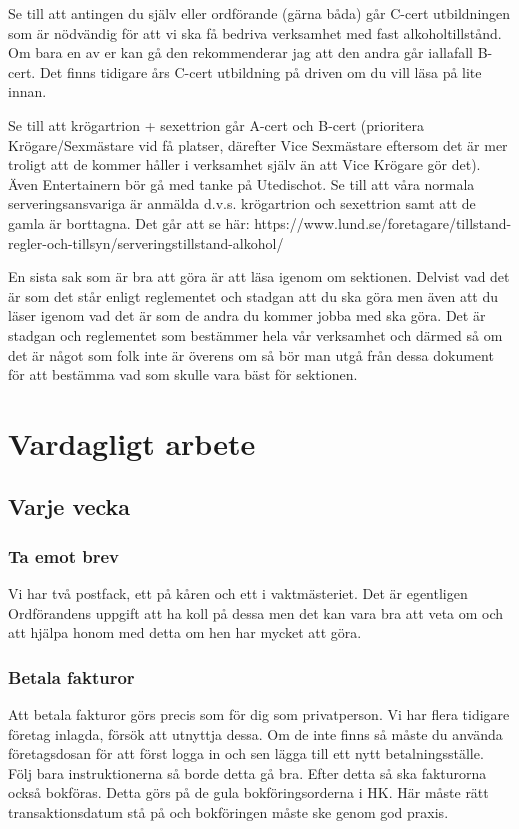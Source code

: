 \documentclass[10pt]{article}
\begin{document}
Se till att antingen du själv eller ordförande (gärna båda) går C-cert utbildningen som är nödvändig för att vi ska få bedriva verksamhet med fast alkoholtillstånd. Om bara en av er kan gå den rekommenderar jag att den andra går iallafall B-cert. Det finns tidigare års C-cert utbildning på driven om du vill läsa på lite innan.

Se till att krögartrion + sexettrion går A-cert och B-cert (prioritera Krögare/Sexmästare vid få platser, därefter Vice Sexmästare eftersom det är mer troligt att de kommer håller i verksamhet själv än att Vice Krögare gör det). Även Entertainern bör gå med tanke på Utedischot.
Se till att våra normala serveringsansvariga är anmälda d.v.s. krögartrion och sexettrion samt att de gamla är borttagna. 
Det går att se här: https://www.lund.se/foretagare/tillstand-regler-och-tillsyn/serveringstillstand-alkohol/

En sista sak som är bra att göra är att läsa igenom om sektionen. Delvist vad det är som det står enligt reglementet och stadgan att du ska göra men även att du läser igenom vad det är som de andra du kommer jobba med ska göra. Det är stadgan och reglementet som bestämmer hela vår verksamhet och därmed så om det är något som folk inte är överens om så bör man utgå från dessa dokument för att bestämma vad som skulle vara bäst för sektionen.

\section{Vardagligt arbete}
\subsection{Varje vecka}
\subsubsection {Ta emot brev}
Vi har två postfack, ett på kåren och ett i vaktmästeriet. Det är egentligen Ordförandens uppgift att ha koll på dessa men det kan vara bra att veta om och att hjälpa honom med detta om hen har mycket att göra.

\subsubsection{Betala fakturor}
Att betala fakturor görs precis som för dig som privatperson. Vi har flera tidigare företag inlagda, försök att utnyttja dessa. Om de inte finns så måste du använda företagsdosan för att först logga in och sen lägga till ett nytt betalningsställe. Följ bara instruktionerna så borde detta gå bra. \newline
Efter detta så ska fakturorna också bokföras. Detta görs på de gula bokföringsorderna i HK. Här måste rätt transaktionsdatum stå på och bokföringen måste ske genom god praxis.
\end{document}
